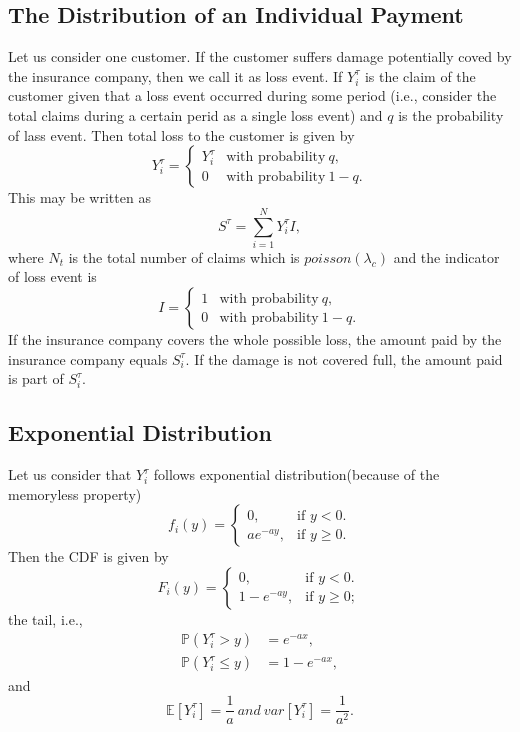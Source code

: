 \documentclass[a4paper,english,12pt]{article}
\begin{document}
\subsection{The Distribution of an Individual Payment}
Let us consider one customer. If the customer suffers damage potentially coved by the insurance company, then we call it as loss event. If $Y_i^\tau$ is the claim of the customer given that a loss event occurred during some period (i.e., consider the total claims during a certain perid as a single loss event) and $q$ is the probability of lass event. Then total loss to the customer is given by
\begin{equation}
  Y_i^\tau=\begin{cases}
    Y_i^\tau  & \text{with probability} \ q,\\
    0  & \text{with probability} \ 1-q.
  \end{cases}
\end{equation}
This may be written as
\begin{equation}
S^\tau=\sum_{i=1}^{N}Y_i^\tau I,
\end{equation}
where $N_t$ is the total number of claims which is $poisson(\lambda_c)$ and  the indicator of loss event is
\begin{equation}
  I=\begin{cases}
    1  & \text{with probability} \ q,\\
    0  & \text{with probability} \ 1-q.
  \end{cases}
\end{equation}
If the insurance company covers the whole possible loss, the amount paid by the insurance company equals $S_i^\tau$. If the damage is not covered full, the amount paid is part of $S_i^\tau$.
\subsection{Exponential Distribution}
Let us consider that $Y_i^\tau$ follows exponential distribution(because of the memoryless property)
\begin{equation}
  f_i(y)=\begin{cases}
    0, & \text{if $y<0$}.\\
    ae^{-ay}, & \text{if $y\geq 0$}.
  \end{cases}
\end{equation}
Then the CDF is given by
\begin{equation}
  F_i(y)=\begin{cases}
    0, & \text{if $y<0$}.\\
    1-e^{-ay}, & \text{if $y\geq 0$};
  \end{cases}
\end{equation}
the tail, i.e.,
\begin{align*}
\mathbb{P}(Y_i^\tau>y)&=e^{-ax},\\
\mathbb{P}(Y_i^\tau\leq y)&=1-e^{-ax},
\end{align*}
and
\begin{equation*}
\mathbb{E}[Y_i^\tau]=\frac{1}{a} \ and \ var[Y_i^\tau]=\frac{1}{a^2}.
\end{equation*}
\end{document}
